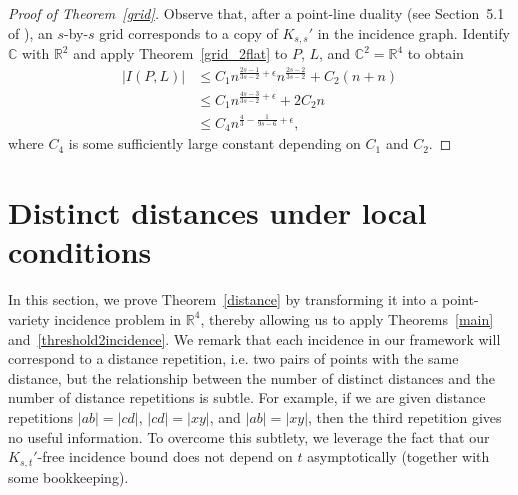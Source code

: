 \documentclass[11pt]{article}
\theoremstyle{definition}
\begin{document}
\begin{proof}[Proof of Theorem~\ref{grid}]
Observe that, after a point-line duality (see Section~5.1 of \cite{matousek2013lectures}), an $s$-by-$s$ grid corresponds to a copy of $K_{s,s}'$ in the incidence graph. Identify $\mathbb{C}$ with $\mathbb{R}^2$ and apply Theorem~\ref{grid_2flat} to $P$, $L$, and $\mathbb{C}^2 = \mathbb{R}^4$ to obtain
\begin{align*}
    |I(P,L)| &\leq C_1 n^{\frac{2s-1}{3s-2}+\epsilon}n^{\frac{2s-2}{3s-2}}+C_2(n+n)\\
    &\leq C_1 n^{\frac{4s-3}{3s-2}+\epsilon} + 2C_2n\\
    &\leq C_4 n^{\frac{4}{3}-\frac{1}{9s-6}+\epsilon},
\end{align*} where $C_4$ is some sufficiently large constant depending on $C_1$ and $C_2$.
\end{proof}

\section{Distinct distances under local conditions}\label{sec_distance}

In this section, we prove Theorem~\ref{distance} by transforming it into a point-variety incidence problem in $\mathbb{R}^4$, thereby allowing us to apply Theorems~\ref{main} and~\ref{threshold2incidence}. We remark that each incidence in our framework will correspond to a distance repetition, i.e. two pairs of points with the same distance, but the relationship between the number of distinct distances and the number of distance repetitions is subtle. For example, if we are given distance repetitions $|ab| = |cd|$, $|cd| = |xy|$, and $|ab| = |xy|$, then the third repetition gives no useful information. To overcome this subtlety, we leverage the fact that our $K_{s,t}'$-free incidence bound does not depend on $t$ asymptotically (together with some bookkeeping).
\end{document}
